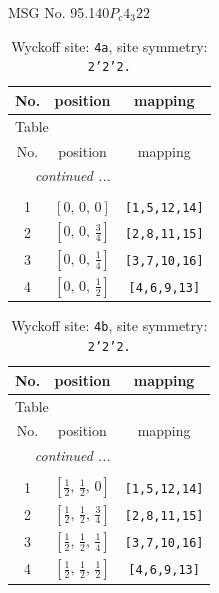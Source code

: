\documentclass[fleqn,8pt]{jsarticle}
\begin{document}
\setcounter{MaxMatrixCols}{32}

\renewcommand{\tablename}{Table~}
\renewcommand{\figurename}{Figure~}
\begin{center}
\LARGE
MSG No. 95.140\quad$P_{c}4_{3}22$
\end{center}
\renewcommand{\arraystretch}{1.2}
\begin{longtable}{ccc}
\caption{Wyckoff site: {\tt 4a}, site symmetry: {\tt 2'2'2.}}
 \\
 \hline \hline
No. & position & mapping \\ \hline \endfirsthead

\multicolumn{2}{l}{\tablename\ \thetable{}} \\
 \hline \hline
No. & position & mapping \\ \hline \endhead

 \hline \hline
\multicolumn{2}{r}{\footnotesize\it continued ...} \\ \endfoot

 \hline \hline
\multicolumn{2}{r}{} \\ \endlastfoot

1 & $\left[ 0,\, 0,\, 0 \right]$ & {\tt [1,5,12,14]} \\ \hline
2 & $\left[ 0,\, 0,\, \frac{3}{4} \right]$ & {\tt [2,8,11,15]} \\ \hline
3 & $\left[ 0,\, 0,\, \frac{1}{4} \right]$ & {\tt [3,7,10,16]} \\ \hline
4 & $\left[ 0,\, 0,\, \frac{1}{2} \right]$ & {\tt [4,6,9,13]} \\
\end{longtable}
\renewcommand{\arraystretch}{1.2}
\begin{longtable}{ccc}
\caption{Wyckoff site: {\tt 4b}, site symmetry: {\tt 2'2'2.}}
 \\
 \hline \hline
No. & position & mapping \\ \hline \endfirsthead

\multicolumn{2}{l}{\tablename\ \thetable{}} \\
 \hline \hline
No. & position & mapping \\ \hline \endhead

 \hline \hline
\multicolumn{2}{r}{\footnotesize\it continued ...} \\ \endfoot

 \hline \hline
\multicolumn{2}{r}{} \\ \endlastfoot

1 & $\left[ \frac{1}{2},\, \frac{1}{2},\, 0 \right]$ & {\tt [1,5,12,14]} \\ \hline
2 & $\left[ \frac{1}{2},\, \frac{1}{2},\, \frac{3}{4} \right]$ & {\tt [2,8,11,15]} \\ \hline
3 & $\left[ \frac{1}{2},\, \frac{1}{2},\, \frac{1}{4} \right]$ & {\tt [3,7,10,16]} \\ \hline
4 & $\left[ \frac{1}{2},\, \frac{1}{2},\, \frac{1}{2} \right]$ & {\tt [4,6,9,13]} \\
\end{longtable}
\end{document}
